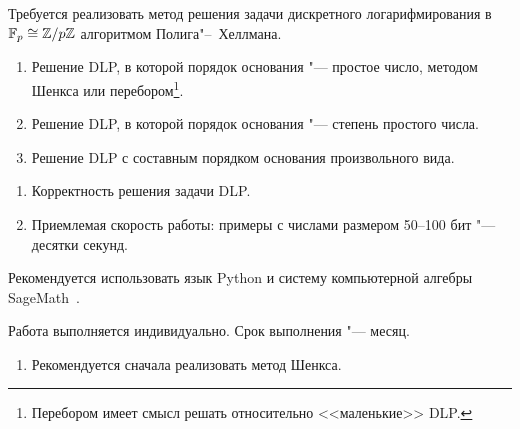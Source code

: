 \documentclass{ca-capstone}
\begin{document}

\goal
Требуется реализовать метод решения задачи дискретного логарифмирования в
$\mathbb{F}_{p} \cong \mathbb{Z}/p\mathbb{Z}$ алгоритмом Полига"--~Хеллмана.

\functionality
\begin{enumerate}
  \item Решение DLP, в которой порядок основания "--- простое число, методом Шенкса или
    перебором\footnote{Перебором имеет смысл решать относительно <<маленькие>> DLP.}.
  \item Решение DLP, в которой порядок основания "--- степень простого числа.
  \item Решение DLP с составным порядком основания произвольного вида.
\end{enumerate}

\requirements
\begin{enumerate}
  \item Корректность решения задачи DLP.
  \item Приемлемая скорость работы: примеры с числами размером 50--100 бит "--- десятки секунд.
\end{enumerate}

\details
Рекомендуется использовать язык Python и систему компьютерной алгебры SageMath~\cite{sagemath}.

\schedule
Работа выполняется индивидуально. Срок выполнения "--- месяц.

\remarks
\begin{enumerate}
  \item Рекомендуется сначала реализовать метод Шенкса.
\end{enumerate}

\end{document}
